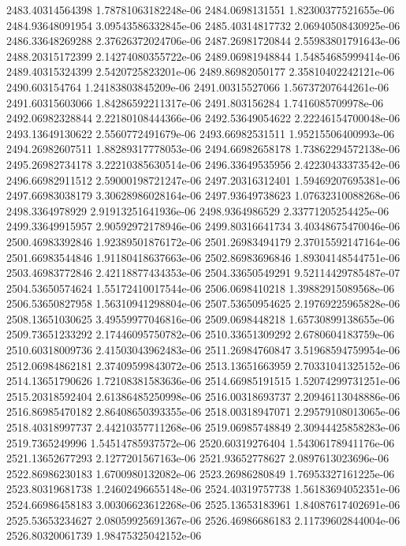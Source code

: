 {2483.40314564398 1.78781063182248e-06
2484.0698131551 1.82300377521655e-06
2484.93648091954 3.09543586332845e-06
2485.40314817732 2.06940508430925e-06
2486.33648269288 2.37626372024706e-06
2487.26981720844 2.55983801791643e-06
2488.20315172399 2.14274080355722e-06
2489.06981948844 1.54854685999414e-06
2489.40315324399 2.5420725823201e-06
2489.86982050177 2.35810402242121e-06
2490.603154764 1.24183803845209e-06
2491.00315527066 1.56737207644261e-06
2491.60315603066 1.84286592211317e-06
2491.803156284 1.7416085709978e-06
2492.06982328844 2.22180108444366e-06
2492.53649054622 2.22246154700048e-06
2493.13649130622 2.5560772491679e-06
2493.66982531511 1.95215506400993e-06
2494.26982607511 1.88289317778053e-06
2494.66982658178 1.73862294572138e-06
2495.26982734178 3.22210385630514e-06
2496.33649535956 2.42230433373542e-06
2496.66982911512 2.59000198721247e-06
2497.20316312401 1.59469207695381e-06
2497.66983038179 3.30628986028164e-06
2497.93649738623 1.07632310088268e-06
2498.3364978929 2.91913251641936e-06
2498.9364986529 2.33771205254425e-06
2499.33649915957 2.90592972178946e-06
2499.80316641734 3.40348675470046e-06
2500.46983392846 1.92389501876172e-06
2501.26983494179 2.37015592147164e-06
2501.66983544846 1.91180418637663e-06
2502.86983696846 1.89304148544751e-06
2503.46983772846 2.42118877434353e-06
2504.33650549291 9.52114429785487e-07
2504.53650574624 1.55172410017544e-06
2506.0698410218 1.39882915089568e-06
2506.53650827958 1.56310941298804e-06
2507.53650954625 2.19769225965828e-06
2508.13651030625 3.49559977046816e-06
2509.0698448218 1.65730899138655e-06
2509.73651233292 2.17446095750782e-06
2510.33651309292 2.6780604183759e-06
2510.60318009736 2.41503043962483e-06
2511.26984760847 3.51968594759954e-06
2512.06984862181 2.37409599843072e-06
2513.13651663959 2.70331041325152e-06
2514.13651790626 1.72108381583636e-06
2514.66985191515 1.52074299731251e-06
2515.20318592404 2.61386485250998e-06
2516.00318693737 2.20946113048886e-06
2516.86985470182 2.86408650393355e-06
2518.00318947071 2.29579108013065e-06
2518.40318997737 2.44210357711268e-06
2519.06985748849 2.30944425858283e-06
2519.7365249996 1.54514785937572e-06
2520.60319276404 1.54306178941176e-06
2521.13652677293 2.1277201567163e-06
2521.93652778627 2.0897613023696e-06
2522.86986230183 1.6700980132082e-06
2523.26986280849 1.76953327161225e-06
2523.80319681738 1.24602496655148e-06
2524.40319757738 1.56183694052351e-06
2524.66986458183 3.00306623612268e-06
2525.13653183961 1.84087617402691e-06
2525.53653234627 2.08059925691367e-06
2526.46986686183 2.11739602844004e-06
2526.80320061739 1.98475325042152e-06
}

